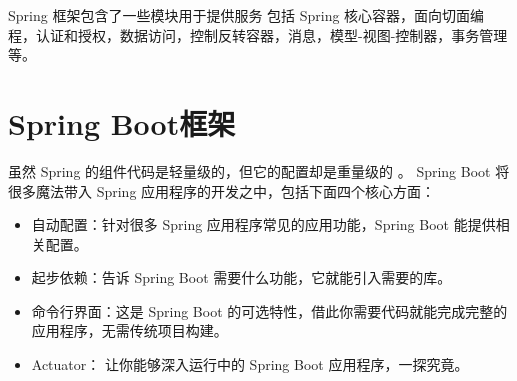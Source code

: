 Spring 框架包含了一些模块用于提供服务\cite{WikiSpring} 包括 Spring 核心容器，面向切面编程，认证和授权，数据访问，控制反转容器，消息，模型-视图-控制器，事务管理等。

\section{Spring Boot框架}
虽然 Spring 的组件代码是轻量级的，但它的配置却是重量级的 \cite{SpringBootInAction} 。
 Spring Boot \cite{SpringBoot} 将很多魔法带入 Spring 应用程序的开发之中，包括下面四个核心方面：

\begin{itemize}
    \item    自动配置：针对很多 Spring 应用程序常见的应用功能，Spring Boot 能提供相关配置。
    \item    起步依赖：告诉 Spring Boot 需要什么功能，它就能引入需要的库。
    \item    命令行界面：这是 Spring Boot 的可选特性，借此你需要代码就能完成完整的应用程序，无需传统项目构建。   
    \item    Actuator： 让你能够深入运行中的 Spring Boot 应用程序，一探究竟\cite{SpringBootInAction}。
\end{itemize}

